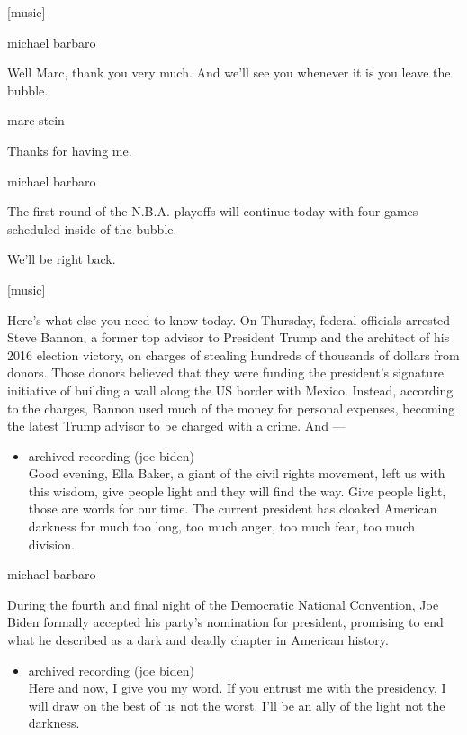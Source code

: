 {[}music{]}

michael barbaro

Well Marc, thank you very much. And we'll see you whenever it is you
leave the bubble.

marc stein

Thanks for having me.

michael barbaro

The first round of the N.B.A. playoffs will continue today with four
games scheduled inside of the bubble.

We'll be right back.

{[}music{]}

Here's what else you need to know today. On Thursday, federal officials
arrested Steve Bannon, a former top advisor to President Trump and the
architect of his 2016 election victory, on charges of stealing hundreds
of thousands of dollars from donors. Those donors believed that they
were funding the president's signature initiative of building a wall
along the US border with Mexico. Instead, according to the charges,
Bannon used much of the money for personal expenses, becoming the latest
Trump advisor to be charged with a crime. And ---

\begin{itemize}
\tightlist
\item
  archived recording (joe biden)\\
  Good evening, Ella Baker, a giant of the civil rights movement, left
  us with this wisdom, give people light and they will find the way.
  Give people light, those are words for our time. The current president
  has cloaked American darkness for much too long, too much anger, too
  much fear, too much division.
\end{itemize}

michael barbaro

During the fourth and final night of the Democratic National Convention,
Joe Biden formally accepted his party's nomination for president,
promising to end what he described as a dark and deadly chapter in
American history.

\begin{itemize}
\tightlist
\item
  archived recording (joe biden)\\
  Here and now, I give you my word. If you entrust me with the
  presidency, I will draw on the best of us not the worst. I'll be an
  ally of the light not the darkness.
\end{itemize}

